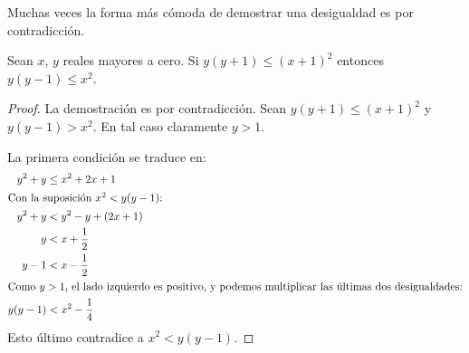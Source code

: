   Muchas veces la forma más cómoda de demostrar una desigualdad%
  es por contradicción.%
  \begin{proposition}
    Sean \(x\), \(y\) reales mayores a cero.
    Si \(y (y + 1) \le (x + 1)^2\)
    entonces \(y (y - 1) \le x^2\).
  \end{proposition}
  \begin{proof}
    La demostración es por contradicción.
    Sean \(y (y + 1) \le (x + 1)^2\) y \(y (y - 1)> x^2\).
    En tal caso claramente \(y > 1\).

    La primera condición se traduce en:
    \begin{align*}
      y^2 + y
	&\le x^2 + 2 x + 1 \\
    \intertext{Con la suposición \(x^2 < y (y - 1)\):}
      y^2 + y
	&< y^2 - y + (2 x + 1) \\
      y &< x + \frac{1}{2} \\
      y - 1
	&< x - \frac{1}{2} \\
    \intertext{Como \(y > 1\),
	       el lado izquierdo es positivo,
	       y podemos multiplicar las últimas dos desigualdades:}
      y (y - 1)
	&< x^2 - \frac{1}{4}
    \end{align*}
    Esto último contradice a \(x^2 < y (y - 1)\).
  \end{proof}

